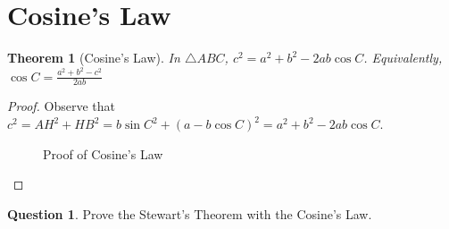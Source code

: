 \documentclass{article}
\newtheorem{theorem}{Theorem}[section]
\theoremstyle{definition}
\newtheorem{question}{Question}
\begin{document}
\newpage

\section{Cosine's Law}
\begin{mdframed}
	\begin{theorem}[Cosine's Law]
		In $\triangle ABC$,  $c^2 = a^2 + b^2 - 2ab\cos C$. Equivalently, $\cos C = \frac{a^2+b^2-c^2}{2ab}$
	\end{theorem}
\end{mdframed}
\begin{proof}
	Observe that $c^2=AH^2+HB^2=b\sin C^2+(a-b\cos C)^2=a^2+b^2-2ab\cos C$.
	\begin{figure}[H]
		\centering
		\caption{Proof of Cosine's Law}
	\end{figure}
\end{proof}
\begin{question}
	Prove the Stewart's Theorem with the Cosine's Law.
\end{question}
\vspace{5cm}
\end{document}
